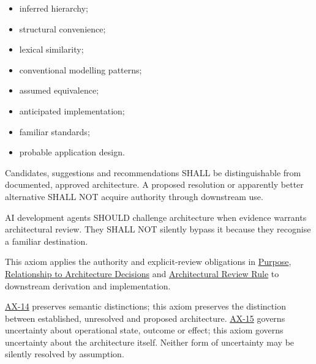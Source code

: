 \begin{itemize}


\item inferred hierarchy;

\item structural convenience;

\item lexical similarity;

\item conventional modelling patterns;

\item assumed equivalence;

\item anticipated implementation;

\item familiar standards;

\item probable application design.

\end{itemize}


Candidates, suggestions and recommendations SHALL be distinguishable from
documented, approved architecture. A proposed resolution or apparently
better alternative SHALL NOT acquire authority through downstream use.



AI development agents SHOULD challenge architecture when evidence
warrants architectural review. They SHALL NOT silently bypass it because
they recognise a familiar destination.



This axiom applies the authority and explicit-review obligations in
\href{\detokenize{../../../../../../../governance/architectural-axioms.md#1-purpose}}{Purpose}, \href{\detokenize{../../../../../../../governance/architectural-axioms.md#6-relationship-to-architecture-decisions}}{Relationship to Architecture Decisions}
and \href{\detokenize{../../../../../../../governance/architectural-axioms.md#7-architectural-review-rule}}{Architectural Review Rule} to downstream
derivation and implementation.



\hyperref[element:d3fc6025dc7646d1b2020b51f7a44bfa]{AX-14} preserves semantic
distinctions; this axiom preserves the distinction between established,
unresolved and proposed architecture.
\hyperref[element:ef8abbaec37e4890ad78b9f263e67906]{AX-15} governs uncertainty
about operational state, outcome or effect; this axiom governs uncertainty
about the architecture itself. Neither form of uncertainty may be silently
resolved by assumption.



